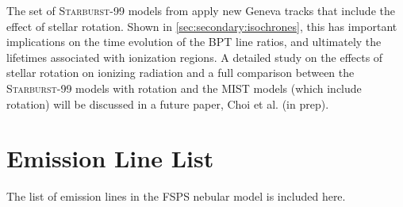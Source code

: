 \documentclass[linenumbers, trackchanges, tighten]{aastex61}%
\newcommand{\Sec}[1]{\autoref{sec:#1}}
\newcommand{\FSPS}{{\sc FSPS}\xspace}
\newcommand{\SB}{\textsc{Starburst-99}\xspace}
\begin{document}
The set of \SB models from \citet{Levesque14} apply new Geneva tracks that include the effect of stellar rotation. Shown in \Sec{secondary:isochrones}, this has important implications on the time evolution of the BPT line ratios, and ultimately the lifetimes associated with ionization regions. A detailed study on the effects of stellar rotation on ionizing radiation and a full comparison between the \SB models with rotation and the MIST models (which include rotation) will be discussed in a future paper, Choi et al. (in prep).

\section{Emission Line List}\label{sec:appendix}
The list of emission lines in the \FSPS nebular model is included here.
\end{document}
